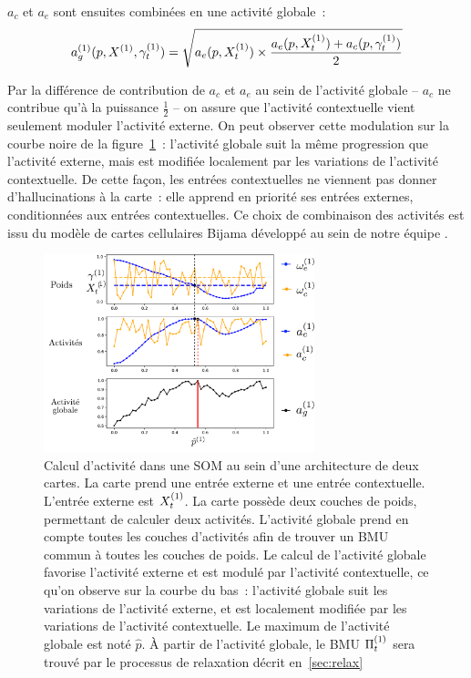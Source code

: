 \documentclass[../main]{subfiles}
\begin{document}
$a_c$ et $a_e$ sont ensuites combinées en une activité globale~:
\begin{equation}
a_g^{({1})}(p, X^{({1})},\gamma^{({1})}_t) = \sqrt{a_e(p, X^{({1})}_t)\times \frac{a_e(p, X^{({1})}_t) + a_c(p,\gamma^{({1})}_t)}{2}}
\end{equation}

Par la différence de contribution de $a_c$ et $a_e$ au sein de l'activité globale -- $a_c$ ne contribue qu'à la puissance $\frac{1}{2}$ -- on assure que l'activité contextuelle vient seulement moduler l'activité externe.
On peut observer cette modulation sur la courbe noire de la figure~\ref{fig:2som_activite}~: l'activité globale suit la même progression que l'activité externe, mais est modifiée localement par les variations de l'activité contextuelle. 
De cette façon, les entrées contextuelles ne viennent pas donner d'\og hallucinations \fg{} à la carte~: elle apprend en priorité ses entrées externes, conditionnées aux entrées contextuelles. Ce choix de combinaison des activités est issu du modèle de cartes cellulaires Bijama développé au sein de notre équipe \parencite{menard05,khouzam_2013,baheux_towards_2014}.

\begin{figure}
    \centering
    \includegraphics[width=0.7\textwidth]{activite_layers_2maps.pdf}
    \caption{Calcul d'activité dans une SOM au sein d'une architecture de deux cartes. La carte prend une entrée externe et une entrée contextuelle. 
    L'entrée externe est $X^{({1})}_t$. La carte possède deux couches de poids, permettant de calculer deux activités. L'activité globale prend en compte toutes les couches d'activités afin de trouver un BMU commun à toutes les couches de poids. Le calcul de l'activité globale favorise l'activité externe et est modulé par l'activité contextuelle, ce qu'on observe sur la courbe du bas~: l'activité globale suit les variations de l'activité externe, et est localement modifiée par les variations de l'activité contextuelle.
    Le maximum de l'activité globale est noté $\hat{p}$. \`A partir de l'activité globale, le BMU $\Pi^{({1})}_t$ sera trouvé par le processus de relaxation décrit en~\ref{sec:relax}\label{fig:2som_activite}}
    \end{figure}
\end{document}
